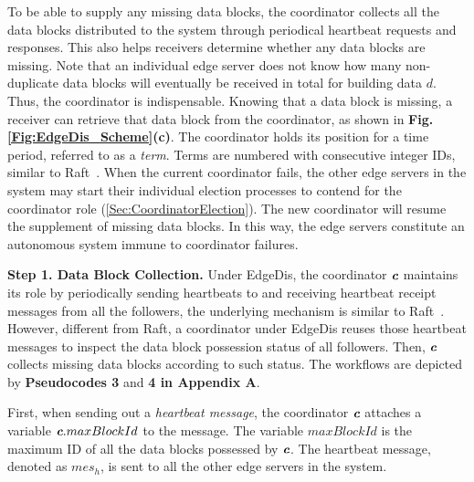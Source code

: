 \documentclass[10pt,journal,compsoc]{IEEEtran}
\def\mathbi#1{\textbf{\em #1}}
\begin{document}
To be able to supply any missing data blocks, the coordinator collects all the data blocks distributed to the system through periodical heartbeat requests and responses. This also helps receivers determine whether any data blocks are missing. Note that an individual edge server does not know how many non-duplicate data blocks will eventually be received in total for building data $d$. Thus, the coordinator is indispensable. Knowing that a data block is missing, a receiver can retrieve that data block from the coordinator, as shown in \textbf{Fig. \ref{Fig:EdgeDis_Scheme}(c)}. The coordinator holds its position for a time period, referred to as a \textit{term}. Terms are numbered with consecutive integer IDs, similar to Raft~\cite{ongaro2014Raft}. When the current coordinator fails, the other edge servers in the system may start their individual election processes to contend for the coordinator role (\cref{Sec:CoordinatorElection}). The new coordinator will resume the supplement of missing data blocks. In this way, the edge servers constitute an autonomous system immune to coordinator failures.

\smallskip
\textbf{Step 1. Data Block Collection.}
Under EdgeDis, the coordinator $\mathbi{c}$ maintains its role by periodically sending heartbeats to and receiving heartbeat receipt messages from all the followers, the underlying mechanism is similar to Raft~\cite{ongaro2014Raft}. However, different from Raft, a coordinator under EdgeDis reuses those heartbeat messages to inspect the data block possession status of all followers. Then, $\mathbi{c}$ collects missing data blocks according to such status. The workflows are depicted by \textbf{Pseudocodes 3} and \textbf{4 in Appendix A}. 


First, when sending out a \textit{heartbeat message}, the coordinator $\mathbi{c}$ attaches a variable $\mathbi{c}.maxBlockId$ to the message. The variable $maxBlockId$ is the maximum ID of all the data blocks possessed by $\mathbi{c}$. The heartbeat message, denoted as $mes_h$, is sent to all the other edge servers in the system.
\end{document}
